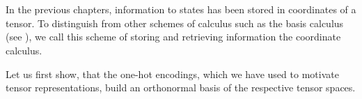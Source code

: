 \chapter{\chatextcoordinateCalculus} \label{cha:coordinateCalculus}

In the previous chapters, information to states has been stored in coordinates of a tensor.
To distinguish from other schemes of calculus such as the basis calculus (see ), we call this scheme of storing and retrieving information the coordinate calculus.


Let us first show, that the one-hot encodings, which we have used to motivate tensor representations, build an orthonormal basis of the respective tensor spaces.

